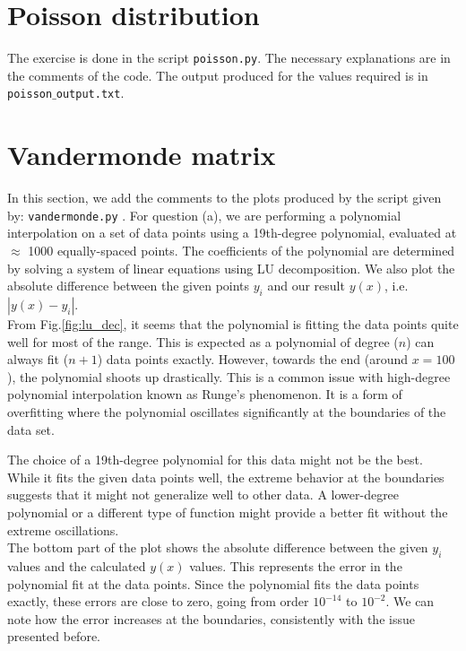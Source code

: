 %
\section{Poisson distribution}
The exercise is done in the script \texttt{poisson.py}. The necessary explanations are in the comments of the code. The output produced for the values required is in \texttt{poisson$\_$output.txt}.

\section{Vandermonde matrix}
In this section, we add the comments to the plots produced by the script given by: \texttt{vandermonde.py}
.
For question (a), we are performing a polynomial interpolation on a set of data points using a 19th-degree polynomial, evaluated at $\approx$ 1000 equally-spaced points. The coefficients of the polynomial are determined by solving a system of linear equations using LU decomposition. We also plot the absolute difference between the given points $y_{i}$ and our result $y(x)$, i.e. $|y(x) - y_{i}|$. \\

From Fig.\ref{fig:lu_dec}, it seems that the polynomial is fitting the data points quite well for most of the range. This is expected as a polynomial of degree ($n$) can always fit ($n+1$) data points exactly. However, towards the end (around $x=100$), the polynomial shoots up drastically. This is a common issue with high-degree polynomial interpolation known as Runge's phenomenon. It is a form of overfitting where the polynomial oscillates significantly at the boundaries of the data set.

The choice of a 19th-degree polynomial for this data might not be the best. While it fits the given data points well, the extreme behavior at the boundaries suggests that it might not generalize well to other data. A lower-degree polynomial or a different type of function might provide a better fit without the extreme oscillations. \\

The bottom part of the plot shows the absolute difference between the given $y_{i}$ values and the calculated $y(x)$ values. This represents the error in the polynomial fit at the data points. Since the polynomial fits the data points exactly, these errors are close to zero, going from order $10^{-14}$ to $10^{-2}$. We can note how the error increases at the boundaries, consistently with the issue presented before. \\

